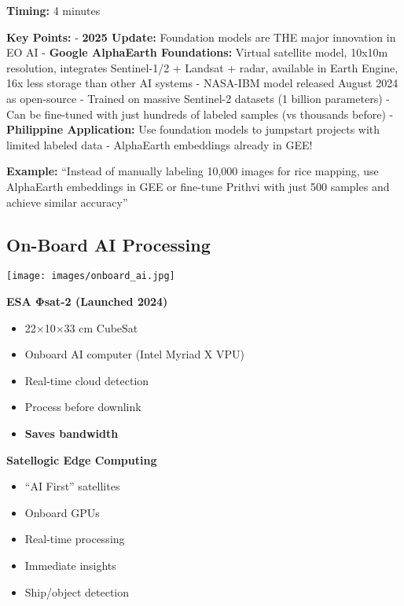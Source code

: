 \documentclass[
  letterpaper,
  DIV=11,
  numbers=noendperiod]{scrartcl}
\providecommand{\tightlist}{%
  \setlength{\itemsep}{0pt}\setlength{\parskip}{0pt}}
\begin{document}
\textbf{Timing:} 4 minutes

\textbf{Key Points:} - \textbf{2025 Update:} Foundation models are THE
major innovation in EO AI - \textbf{Google AlphaEarth Foundations:}
Virtual satellite model, 10x10m resolution, integrates Sentinel-1/2 +
Landsat + radar, available in Earth Engine, 16x less storage than other
AI systems - NASA-IBM model released August 2024 as open-source -
Trained on massive Sentinel-2 datasets (1 billion parameters) - Can be
fine-tuned with just hundreds of labeled samples (vs thousands before) -
\textbf{Philippine Application:} Use foundation models to jumpstart
projects with limited labeled data - AlphaEarth embeddings already in
GEE!

\textbf{Example:} ``Instead of manually labeling 10,000 images for rice
mapping, use AlphaEarth embeddings in GEE or fine-tune Prithvi with just
500 samples and achieve similar accuracy''

\subsection{On-Board AI Processing}\label{on-board-ai-processing}

\begin{center}
\texttt{[image: images/onboard\_ai.jpg]}
\end{center}

\textbf{ESA Φsat-2 (Launched 2024)}

\begin{itemize}
\tightlist
\item
  22×10×33 cm CubeSat
\item
  Onboard AI computer (Intel Myriad X VPU)
\item
  Real-time cloud detection
\item
  Process before downlink
\item
  \textbf{Saves bandwidth}
\end{itemize}

\textbf{Satellogic Edge Computing}

\begin{itemize}
\tightlist
\item
  ``AI First'' satellites
\item
  Onboard GPUs
\item
  Real-time processing
\item
  Immediate insights
\item
  Ship/object detection
\end{itemize}
\end{document}
